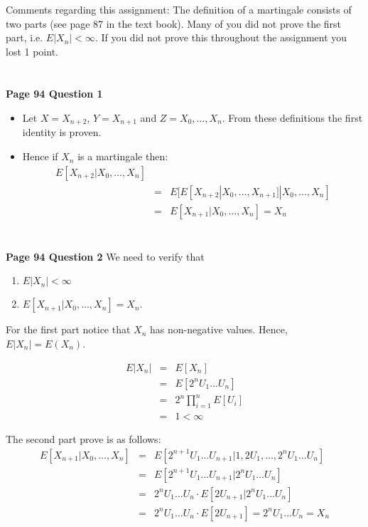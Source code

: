 \documentclass[10pt,a4paper]{article}
\begin{document}
\begin{flushleft}
Comments regarding this assignment: The definition of a martingale
consists of two parts (see page 87 in the text book). Many of you
did not prove the first part, i.e. $E|X_n|<\infty$. If you did not
prove this throughout the assignment you lost 1 point.



\begin{eqnarray*}
\\
\end{eqnarray*}

\textbf{Page 94 Question 1}
\begin{itemize}
    \item Let $X=X_{n+2}$, $Y=X_{n+1}$ and $Z={X_0,\ldots,X_n}$.
    From these definitions the first identity is proven.
    \item Hence if $X_n$ is a martingale then:
    \begin{eqnarray*}
    E[X_{n+2}|X_0,\ldots,X_n]\\
    &=&E[E[X_{n+2}|X_0,\ldots,X_{n+1}]|X_0,\ldots,X_n]\\
    &=&E[X_{n+1}|X_0,\ldots,X_n]= X_n
    \end{eqnarray*}

    \end{itemize}



\begin{eqnarray*}
\\
\end{eqnarray*}

\textbf{Page 94 Question 2} We need to verify that
\begin{enumerate}
    \item $E|X_n|<\infty$
    \item $E[X_{n+1}|X_0,\ldots,X_n]=X_n$.

\end{enumerate}
For the first part notice that $X_n$ has non-negative values.
Hence, $E|X_n|=E(X_n)$.

\begin{eqnarray*}
E|X_n|&=&E[X_n]\\
&=& E[2^{n}U_1\ldots U_{n}]\\
&=& 2^n \prod_{i=1}^n E[U_i]\\
&=& 1<\infty
\end{eqnarray*}

The second part prove is as follows:
\begin{eqnarray*}
E[X_{n+1}|X_0,\ldots,X_n]&=& E[2^{n+1}U_1\ldots
U_{n+1}|1,2U_1,\ldots,2^n U_1 \ldots U_n]\\
&=& E[2^{n+1}U_1\ldots
U_{n+1}|2^n U_1 \ldots U_n]\\
&=& 2^{n}U_1 \ldots U_n \cdot E[2U_{n+1}|2^n U_1 \ldots U_n]\\
&=& 2^{n} U_1 \ldots U_n \cdot E[2U_{n+1}] = 2^n U_1 \ldots U_n =
X_n
\end{eqnarray*}




\end{flushleft}
\end{document}
